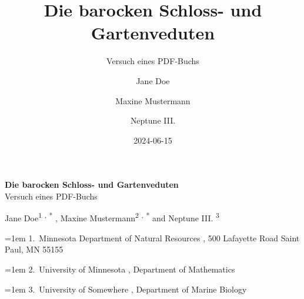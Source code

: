 \documentclass[
  11pt,
  a4paper,
  openany]{book}
\title{Die barocken Schloss- und Gartenveduten}
\subtitle{Versuch eines PDF-Buchs}
\author{Jane Doe \and Maxine Mustermann \and Neptune III.}
\date{2024-06-15}
\begin{document}
  \begin{frontmatter}
  \begin{titlepage}






  \begin{tcolorbox}


  \centering

  {\Huge\bfseries\nohyphens{Die barocken Schloss- und
  Gartenveduten}}\\[1\baselineskip]
    {\huge{Versuch eines PDF-Buchs}}\\[4\baselineskip]

  \end{tcolorbox}

  \bigbreak

  \begin{tcolorbox}

        {\large{Jane Doe}}{\textsuperscript{1}}%
    \textsuperscript{,}%
    {\textsuperscript{*}}%
    , 
        {\large{Maxine Mustermann}}{\textsuperscript{2}}%
    \textsuperscript{,}%
    {\textsuperscript{*}}%
      { and \large{Neptune III.}}%
    {\textsuperscript{3}}%
    
    
  \vspace{2\baselineskip} 

  \hangindent=1em
  {1}.~{Minnesota Department of Natural Resources}%
  , %
  {500 Lafayette Road Saint Paul, MN 55155}%
  \par\hangindent=1em%
  {2}.~{University of Minnesota}%
  , %
  {Department of Mathematics}%
  \par\hangindent=1em%
  {3}.~{University of Somewhere}%
  , %
  {Department of Marine Biology}%



\end{tcolorbox}
\end{titlepage}
\end{frontmatter}
\end{document}
